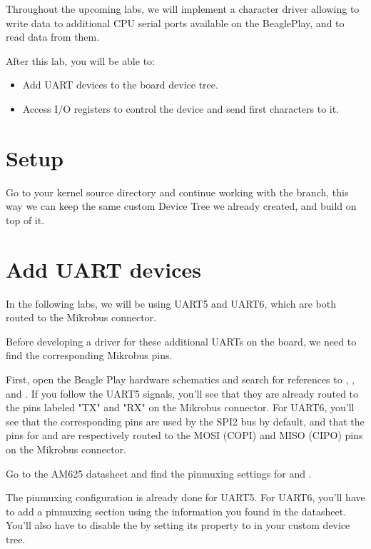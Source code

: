 
Throughout the upcoming labs, we will implement a character driver
allowing to write data to additional CPU serial ports available on
the BeaglePlay, and to read data from them.

After this lab, you will be able to:

\begin{itemize}
\item Add UART devices to the board device tree.
\item Access I/O registers to control the device and
      send first characters to it.
\end{itemize}

\section{Setup}

Go to your kernel source directory and continue working with the
 branch, this way we can keep the same custom Device
Tree we already created, and build on top of it.

\section{Add UART devices}

In the following labs, we will be using UART5 and UART6, which are both
routed to the Mikrobus connector.

Before developing a driver for these additional UARTs on the board, we
need to find the corresponding Mikrobus pins.

First, open the Beagle Play hardware schematics and search for references to
, ,  and . If you
follow the UART5 signals, you'll see that they are already routed to the pins
labeled "TX" and "RX" on the Mikrobus connector. For UART6, you'll see that the
corresponding pins are used by the SPI2 bus by default, and that the pins for
 and  are respectively routed to the MOSI (COPI) and
MISO (CIPO) pins on the Mikrobus connector.

Go to the AM625 datasheet and find the pinmuxing settings for  and .

The pinmuxing configuration is already done for UART5. For UART6, you'll have to add
a pinmuxing section using the information you found in the datasheet. You'll also have to disable the  by setting its  property to  in your custom device tree.

